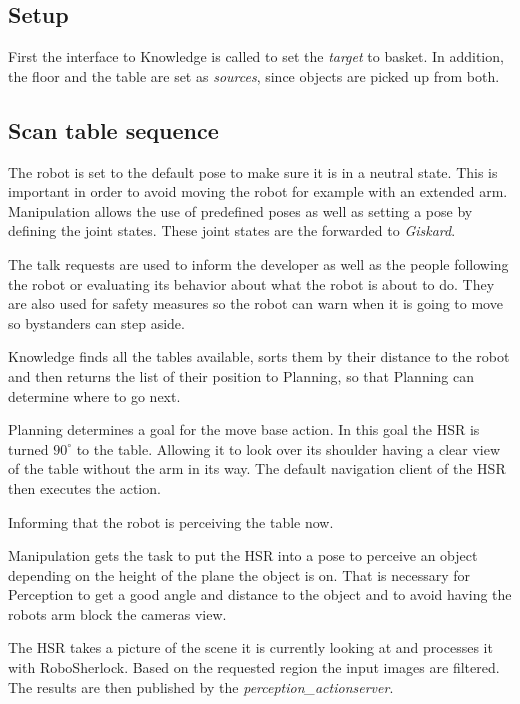 \documentclass[main.tex]{subfiles}
\begin{document}
	\subsection{Setup}
	First the interface to Knowledge is called to set the \textit{target} to basket. In addition, the floor and the table are set as \textit{sources}, since objects are picked up from both. 

	\subsection{Scan table sequence}
	
	The robot is set to the default pose to make sure it is in a neutral state. This is important in order to avoid moving the robot for example with an extended arm. Manipulation allows the use of predefined poses as well as setting a pose by defining the joint states. These joint states are the forwarded to \textit{Giskard}.
	
	
	The talk requests are used to inform the developer as well as the people following the robot or evaluating its behavior about what the robot is about to do. They are also used for safety measures so the robot can warn when it is going to move so bystanders can step aside. 
	
	Knowledge finds all the tables available, sorts them by their distance to the robot and then returns the list of their position to Planning, so that Planning can determine where to go next.
	
	Planning determines a goal for the move base action. In this goal the HSR is turned $90^\circ$ to the table. Allowing it to look over its shoulder having a clear view of the table without the arm in its way. The default navigation client of the HSR then executes the action. 
	
	Informing that the robot is perceiving the table now.
	
	Manipulation gets the task to put the HSR into a pose to perceive an object depending on the height of the plane the object is on.
    That is necessary for Perception to get a good angle and distance to the object and to avoid having the robots arm block the cameras view.
	
	The HSR takes a picture of the scene it is currently looking at and processes it with RoboSherlock. Based on the requested region the input images are filtered. The results are then published by the \textit{perception\_actionserver}.
	
\end{document}
